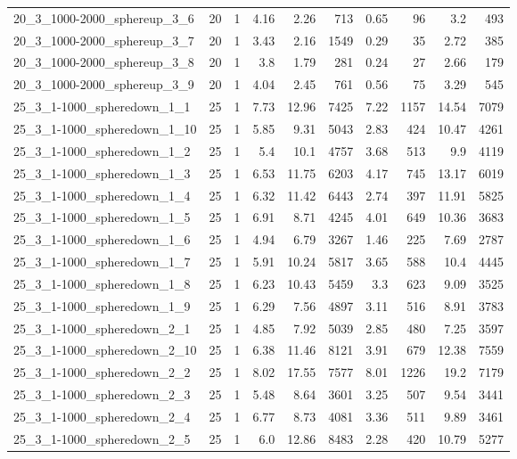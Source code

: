 \begin{center}
\begin{scriptsize}
\begin{longtable}{lrrrrrrrrr}
20\_3\_1000-2000\_sphereup\_3\_6 & 20 & 1 & 4.16 & 2.26 & 713 & 0.65 & 96 & 3.2 & 493\\
20\_3\_1000-2000\_sphereup\_3\_7 & 20 & 1 & 3.43 & 2.16 & 1549 & 0.29 & 35 & 2.72 & 385\\
20\_3\_1000-2000\_sphereup\_3\_8 & 20 & 1 & 3.8 & 1.79 & 281 & 0.24 & 27 & 2.66 & 179\\
20\_3\_1000-2000\_sphereup\_3\_9 & 20 & 1 & 4.04 & 2.45 & 761 & 0.56 & 75 & 3.29 & 545\\
25\_3\_1-1000\_spheredown\_1\_1 & 25 & 1 & 7.73 & 12.96 & 7425 & 7.22 & 1157 & 14.54 & 7079\\
25\_3\_1-1000\_spheredown\_1\_10 & 25 & 1 & 5.85 & 9.31 & 5043 & 2.83 & 424 & 10.47 & 4261\\
25\_3\_1-1000\_spheredown\_1\_2 & 25 & 1 & 5.4 & 10.1 & 4757 & 3.68 & 513 & 9.9 & 4119\\
25\_3\_1-1000\_spheredown\_1\_3 & 25 & 1 & 6.53 & 11.75 & 6203 & 4.17 & 745 & 13.17 & 6019\\
25\_3\_1-1000\_spheredown\_1\_4 & 25 & 1 & 6.32 & 11.42 & 6443 & 2.74 & 397 & 11.91 & 5825\\
25\_3\_1-1000\_spheredown\_1\_5 & 25 & 1 & 6.91 & 8.71 & 4245 & 4.01 & 649 & 10.36 & 3683\\
25\_3\_1-1000\_spheredown\_1\_6 & 25 & 1 & 4.94 & 6.79 & 3267 & 1.46 & 225 & 7.69 & 2787\\
25\_3\_1-1000\_spheredown\_1\_7 & 25 & 1 & 5.91 & 10.24 & 5817 & 3.65 & 588 & 10.4 & 4445\\
25\_3\_1-1000\_spheredown\_1\_8 & 25 & 1 & 6.23 & 10.43 & 5459 & 3.3 & 623 & 9.09 & 3525\\
25\_3\_1-1000\_spheredown\_1\_9 & 25 & 1 & 6.29 & 7.56 & 4897 & 3.11 & 516 & 8.91 & 3783\\
25\_3\_1-1000\_spheredown\_2\_1 & 25 & 1 & 4.85 & 7.92 & 5039 & 2.85 & 480 & 7.25 & 3597\\
25\_3\_1-1000\_spheredown\_2\_10 & 25 & 1 & 6.38 & 11.46 & 8121 & 3.91 & 679 & 12.38 & 7559\\
25\_3\_1-1000\_spheredown\_2\_2 & 25 & 1 & 8.02 & 17.55 & 7577 & 8.01 & 1226 & 19.2 & 7179\\
25\_3\_1-1000\_spheredown\_2\_3 & 25 & 1 & 5.48 & 8.64 & 3601 & 3.25 & 507 & 9.54 & 3441\\
25\_3\_1-1000\_spheredown\_2\_4 & 25 & 1 & 6.77 & 8.73 & 4081 & 3.36 & 511 & 9.89 & 3461\\
25\_3\_1-1000\_spheredown\_2\_5 & 25 & 1 & 6.0 & 12.86 & 8483 & 2.28 & 420 & 10.79 & 5277\\

\end{longtable}
\end{scriptsize}
\end{center}

